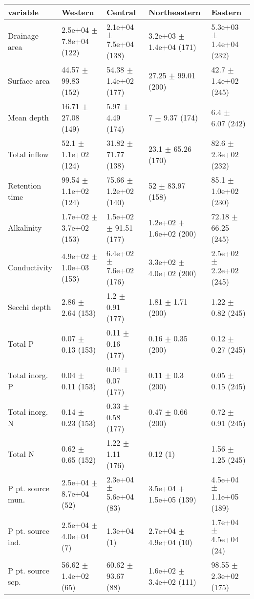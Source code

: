 \documentclass{article}
\begin{document}
\begin{landscape}
\begin{table}[!h]
\centering
\begin{tabular}{lllll}
\toprule
variable & Western & Central & Northeastern & Eastern\\
\midrule
Drainage area & 2.5e+04 $\pm$ 7.8e+04 (122) & 2.1e+04 $\pm$ 7.5e+04 (138) & 3.2e+03 $\pm$ 1.4e+04 (171) & 5.3e+03 $\pm$ 1.4e+04 (232)\\
Surface area & 44.57 $\pm$ 99.83 (152) & 54.38 $\pm$ 1.4e+02 (177) & 27.25 $\pm$ 99.01 (200) & 42.7 $\pm$ 1.4e+02 (245)\\
Mean depth & 16.71 $\pm$ 27.08 (149) & 5.97 $\pm$ 4.49 (174) & 7 $\pm$ 9.37 (174) & 6.4 $\pm$ 6.07 (242)\\
Total inflow & 52.1 $\pm$ 1.1e+02 (124) & 31.82 $\pm$ 71.77 (138) & 23.1 $\pm$ 65.26 (170) & 82.6 $\pm$ 2.3e+02 (232)\\
Retention time & 99.54 $\pm$ 1.1e+02 (124) & 75.66 $\pm$ 1.2e+02 (140) & 52 $\pm$ 83.97 (158) & 85.1 $\pm$ 1.0e+02 (230)\\
\addlinespace
Alkalinity & 1.7e+02 $\pm$ 3.7e+02 (153) & 1.5e+02 $\pm$ 91.51 (177) & 1.2e+02 $\pm$ 1.6e+02 (200) & 72.18 $\pm$ 66.25 (245)\\
Conductivity & 4.9e+02 $\pm$ 1.0e+03 (153) & 6.4e+02 $\pm$ 7.6e+02 (176) & 3.3e+02 $\pm$ 4.0e+02 (200) & 2.5e+02 $\pm$ 2.2e+02 (245)\\
Secchi depth & 2.86 $\pm$ 2.64 (153) & 1.2 $\pm$ 0.91 (177) & 1.81 $\pm$ 1.71 (200) & 1.22 $\pm$ 0.82 (245)\\
Total P & 0.07 $\pm$ 0.13 (153) & 0.11 $\pm$ 0.16 (177) & 0.16 $\pm$ 0.35 (200) & 0.12 $\pm$ 0.27 (245)\\
Total inorg. P & 0.04 $\pm$ 0.11 (153) & 0.04 $\pm$ 0.07 (177) & 0.11 $\pm$ 0.3 (200) & 0.05 $\pm$ 0.15 (245)\\
\addlinespace
Total inorg. N & 0.14 $\pm$ 0.23 (153) & 0.33 $\pm$ 0.58 (177) & 0.47 $\pm$ 0.66 (200) & 0.72 $\pm$ 0.91 (245)\\
Total N & 0.62 $\pm$ 0.65 (152) & 1.22 $\pm$ 1.11 (176) & 0.12 (1) & 1.56 $\pm$ 1.25 (245)\\
P pt. source mun. & 2.5e+04 $\pm$ 8.7e+04 (52) & 2.3e+04 $\pm$ 5.6e+04 (83) & 3.5e+04 $\pm$ 1.5e+05 (139) & 4.5e+04 $\pm$ 1.1e+05 (189)\\
P pt. source ind. & 2.5e+04 $\pm$ 4.0e+04 (7) & 1.3e+04 (1) & 2.7e+04 $\pm$ 4.9e+04 (10) & 1.7e+04 $\pm$ 4.5e+04 (24)\\
P pt. source sep. & 56.62 $\pm$ 1.4e+02 (65) & 60.62 $\pm$ 93.67 (88) & 1.6e+02 $\pm$ 3.4e+02 (111) & 98.55 $\pm$ 2.3e+02 (175)\\

\end{tabular}
\end{table}
\end{landscape}
\end{document}
